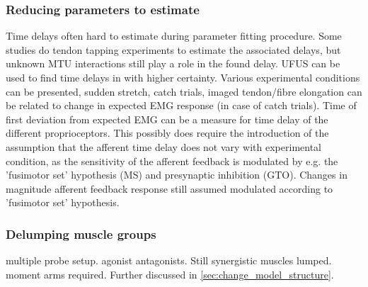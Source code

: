 \subsubsection{Reducing parameters to estimate}
Time delays often hard to estimate during parameter fitting procedure. Some studies do tendon tapping experiments to estimate the associated delays, but unknown MTU interactions still play a role in the found delay. UFUS can be used to find time delays in with higher certainty. Various experimental conditions can be presented, sudden stretch, catch trials, imaged tendon/fibre elongation can be related to change in expected EMG response (in case of catch trials). Time of first deviation from expected EMG can be a measure for time delay of the different proprioceptors. This possibly does require the introduction of the assumption that the afferent time delay does not vary with experimental condition, as the sensitivity of the afferent feedback is modulated by e.g. the 'fusimotor set' hypothesis (MS) and presynaptic inhibition (GTO). Changes in magnitude afferent feedback response still assumed modulated according to 'fusimotor set' hypothesis. 



\subsubsection{Delumping muscle groups}
multiple probe setup. agonist antagonists. 
Still synergistic muscles lumped. 
moment arms required. 
Further discussed in \autoref{sec:change_model_structure}.









